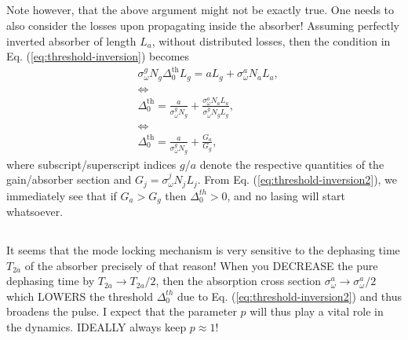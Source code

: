 \documentclass[preprint,secnumarabic,amssymb, nobibnotes, aip, prd]{revtex4-1}
\begin{document}
\subsection{}
	Note however, that the above argument might not be exactly true. One needs to also consider the losses upon propagating inside the absorber! Assuming perfectly inverted absorber of length $L_a$, without distributed losses, then the condition in Eq. (\ref{eq:threshold-inversion}) becomes
	\begin{align}
	\label{eq:threshold-inversion2}
	&\sigma_{\omega}^{g}N_g\Delta_0^{\text{th}}L_g = aL_g+ \sigma_{\omega}^a N_a L_a, \nonumber \\
	& \Leftrightarrow \nonumber \\
	&\Delta_0^{\text{th}} = \frac{a}{\sigma_{\omega}^{g}N_g} + \frac{\sigma_{\omega}^{a}N_a L_a}{\sigma_{\omega}^{g}N_g L_g}, \nonumber \\
	& \Leftrightarrow \nonumber \\
	&\Delta_0^{\text{th}} = \frac{a}{\sigma_{\omega}^{g}N_g} +  \frac{G_a}{G_g},
	\end{align}
	where subscript/superscript indices $g$/$a$ denote the respective quantities of the gain/absorber section and $G_j = \sigma_{\omega}^{j}N_j L_j$. From Eq. (\ref{eq:threshold-inversion2}), we immediately see that 
	if $G_a>G_g$ then $\Delta_0^{th} > 0$, and no lasing will start whatsoever. 
\subsection{}
	It seems that the mode locking mechanism is very sensitive to the dephasing time $T_{2a}$ of the absorber precisely of that reason! When you DECREASE the pure dephasing time by $T_{2a}\rightarrow T_{2a}/2$, then the absorption cross section $\sigma_\omega^{a} \rightarrow \sigma_\omega^{a}/2$ which LOWERS the threshold $\Delta_{0}^{th}$ due to Eq. (\ref{eq:threshold-inversion2}) and thus broadens the pulse. I expect that the parameter $p$ will thus play a vital role in the dynamics. IDEALLY always keep $p \approx 1$!  
\end{document}
